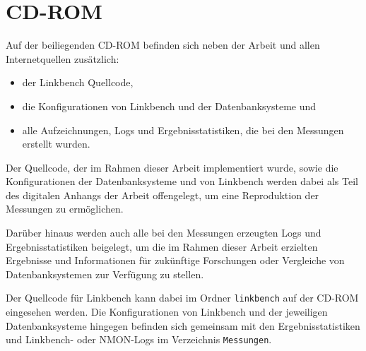 \chapter{CD-ROM}

Auf der beiliegenden CD-ROM befinden sich neben der Arbeit und allen Internetquellen zusätzlich:
\begin{itemize}
    \item der Linkbench Quellcode,
    \item die Konfigurationen von Linkbench und der Datenbanksysteme und
    \item alle Aufzeichnungen, Logs und Ergebnisstatistiken, die bei den Messungen erstellt wurden. 
\end{itemize}

Der Quellcode, der im Rahmen dieser Arbeit implementiert wurde, sowie die Konfigurationen der Datenbanksysteme und von Linkbench werden dabei als Teil des digitalen Anhangs der Arbeit offengelegt, um eine Reproduktion der Messungen zu ermöglichen. 

Darüber hinaus werden auch alle bei den Messungen erzeugten Logs und Ergebnisstatistiken beigelegt, um die im Rahmen dieser Arbeit erzielten Ergebnisse und Informationen für zukünftige Forschungen oder Vergleiche von Datenbanksystemen zur Verfügung zu stellen. 

Der Quellcode für Linkbench kann dabei im Ordner \texttt{linkbench} auf der CD-ROM eingesehen werden. Die Konfigurationen von Linkbench und der jeweiligen Datenbanksysteme hingegen befinden sich gemeinsam mit den Ergebnisstatistiken und Linkbench- oder NMON-Logs im Verzeichnis \texttt{Messungen}.